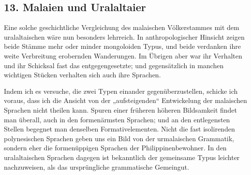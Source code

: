 \subsection*{13. Malaien und {\color{lsLightWine}Uralaltaier}}\label{IV.IV.13}

Eine solche geschichtliche Vergleichung des malaischen Völkerstammes mit dem uralaltaischen wäre nun besonders lehrreich. In anthropologischer Hinsicht zeigen beide Stämme mehr oder minder mongoloiden Typus, und beide verdanken ihre weite Verbreitung erobernden Wanderungen. Im Übrigen aber war ihr Verhalten und ihr Schicksal fast das entgegengesetzte; und gegensätzlich in manchen wichtigen Stücken verhalten sich auch ihre Sprachen.

Indem ich es versuche, die zwei Typen einander gegenüberzustellen, schicke ich voraus, dass ich die Ansicht von der „aufsteigenden“ Entwickelung der malaischen Sprachen nicht theilen kann. Spuren einer früheren höheren Bildsamkeit findet man überall, auch in den formenärmsten Sprachen; und an den entlegensten Stellen begegnet man denselben Formativelementen. Nicht die fast isolirenden polynesischen Sprachen geben uns ein Bild von der urmalaischen Grammatik, sondern eher die formenüppigen Sprachen der Philippinenbewohner. In den ural\label{fp.394}altaischen Sprachen dagegen ist bekanntlich der gemeinsame Typus leichter nachzuweisen, als das ursprüngliche grammatische Gemeingut.

